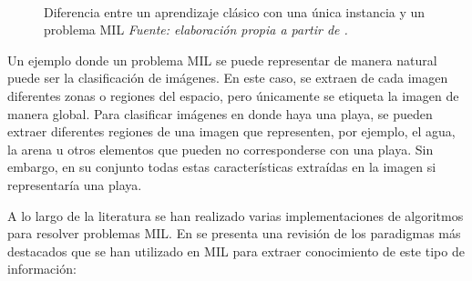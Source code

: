 \documentclass[c5paper,10pt,twoside]{book}	   	%
\begin{document}
\begin{figure}[!hbtp]
		\centering
	 \\
	\caption[Diferencia entre aprendizaje clásico y multi-instancia]{Diferencia entre un aprendizaje clásico con una única instancia y un problema \ac{MIL} \textit{Fuente: elaboración propia a partir de \cite{Lcgjv19}.}}
	\label{fig:MIL_ejemplo}
\end{figure}

Un ejemplo donde un problema \ac{MIL} se puede representar de manera natural puede ser la clasificación de imágenes. En este caso, se extraen de cada imagen diferentes zonas o regiones del espacio, pero únicamente se etiqueta la imagen de manera global. Para clasificar imágenes en donde haya una playa, se pueden extraer diferentes regiones de una imagen que representen, por ejemplo, el agua, la arena u otros elementos que pueden no corresponderse con una playa. Sin embargo, en su conjunto todas estas características extraídas en la imagen si representaría una playa.

A lo largo de la literatura se han realizado varias implementaciones de algoritmos para resolver problemas \ac{MIL}. En \cite{Amores13} se presenta una revisión de los paradigmas más destacados que se han utilizado en \ac{MIL} para extraer conocimiento de este tipo de información: 
\end{document}
